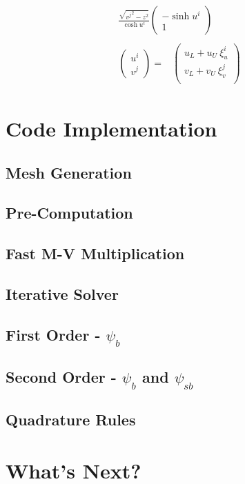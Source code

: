 \documentclass [10pt,letterpaper]{article}
\begin{document}
\begin{subequations}
\begin{align}
\begin{split}
			\frac{ \sqrt{{v^j}^2-z^2} } { \cosh{u^i} } 
			\begin{pmatrix}
				-\sinh{u^i}				\\
				1
			\end{pmatrix}
		\end{split}
		\\
		\begin{split} 
			\begin{pmatrix}
				u^i					\\
				v^j
			\end{pmatrix}
			=&
			\begin{pmatrix}
				u_L
				+ 
				u_U
				\ \xi_u^i				\\
				v_L
				+ 
				v_U
				\ \xi_v^j				\\
			\end{pmatrix}
		\end{split}
	\end{align}
\end{subequations}





\section{Code Implementation}
\label{sec:code-implementation}
\subsection{Mesh Generation}
\label{sub:mesh-generation}
\subsection{Pre-Computation}
\label{sub:pre-computation}
\subsection{Fast M-V Multiplication}
\label{sub:fast-M-V-multiplication}
\subsection{Iterative Solver}
\label{sub:iterative-solver}
\subsection{First Order - $\psi_b$}
\label{sub:first-order-psib}
\subsection{Second Order - $\psi_b$ and $\psi_{sb}$}
\label{sub:second-order-psib-and-psisb} 
\subsection{Quadrature Rules}
\label{sub:quadrature-rules}
\section{What's Next?}
\label{sec:whats-next}
\end{document}

